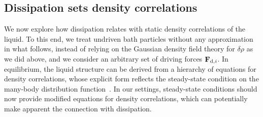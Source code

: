\documentclass[superscriptaddress, twocolumn, prx, longbibliography, nofootinbib]{revtex4-1}
\begin{document}


\subsection{Dissipation sets density correlations}\label{sec:struc}

We now explore how dissipation relates with static density correlations of the liquid. To this end, we treat undriven bath particles without any approximation in what follows, instead of relying on the Gaussian density field theory for $\delta\rho$ as we did above, and we consider an arbitrary set of driving forces ${\bf F}_{{\rm d},i}$. In equilibrium, the liquid structure can be derived from a hierarchy of equations for density correlations, whose explicit form reflects the steady-state condition on the many-body distribution function~\cite{Hansen2013}. In our settings, steady-state conditions should now provide modified equations for density correlations, which can potentially make apparent the connection with dissipation.
\end{document}
